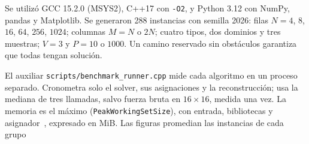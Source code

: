 Se utilizó GCC 15.2.0 (MSYS2), C++17 con \texttt{-O2}, y Python 3.12 con NumPy, pandas y Matplotlib.
Se generaron 288 instancias con semilla 2026: filas $N=4$, $8$, $16$,
$64$, $256$, $1024$; columnas $M=N$ o $2N$; cuatro tipos, dos dominios
y tres muestras; $V=3$ y $P=10$ o $1000$. Un camino reservado sin
obstáculos garantiza que todas tengan solución.

El auxiliar \texttt{scripts/benchmark\_runner.cpp} mide cada algoritmo en
un proceso separado. Cronometra solo el solver, sus asignaciones y la
reconstrucción; usa la mediana de tres llamadas, salvo fuerza bruta en
$16\times16$, medida una vez. La memoria es el máximo
(\texttt{PeakWorkingSetSize}), con entrada, bibliotecas y
asignador~\cite{memoria_windows}, expresado en MiB.
Las figuras promedian las instancias de cada grupo
